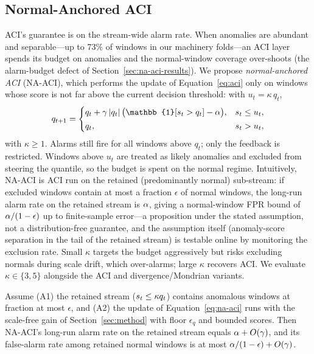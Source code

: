\subsection{Normal-Anchored ACI}
\label{sec:na-aci}
ACI's guarantee is on the stream-wide alarm rate. When anomalies are abundant and separable---up to 73\% of windows in our machinery folds---an ACI layer spends its budget on anomalies and the normal-window coverage over-shoots (the alarm-budget defect of Section~\ref{sec:na-aci-results}). We propose \emph{normal-anchored ACI} (NA-ACI), which performs the update of Equation~\ref{eq:aci} only on windows whose score is not far above the current decision threshold: with $u_t = \kappa\, q_t$,
\begin{equation}
q_{t+1} =
\begin{cases}
q_t + \gamma\,|q_t|\,\bigl(\mathbb{1}[\st>q_t]-\alphaNom\bigr), & \st \le u_t,\\[2pt]
q_t, & \st > u_t,
\end{cases}
\label{eq:na-aci}
\end{equation}
with $\kappa\ge 1$. Alarms still fire for all windows above $q_t$; only the feedback is restricted. Windows above $u_t$ are treated as likely anomalies and excluded from steering the quantile, so the budget is spent on the normal regime. Intuitively, NA-ACI is ACI run on the retained (predominantly normal) sub-stream: if excluded windows contain at most a fraction $\epsilon$ of normal windows, the long-run alarm rate on the retained stream is $\alpha$, giving a normal-window FPR bound of $\alpha/(1-\epsilon)$ up to finite-sample error---a proposition under the stated assumption, not a distribution-free guarantee, and the assumption itself (anomaly-score separation in the tail of the retained stream) is testable online by monitoring the exclusion rate. Small $\kappa$ targets the budget aggressively but risks excluding normals during scale drift, which over-alarms; large $\kappa$ recovers ACI. We evaluate $\kappa\in\{3,5\}$ alongside the ACI and divergence/Mondrian variants.

\begin{proposition}
\label{prop:na-aci}
Assume (A1) the retained stream ($s_t\le\kappa q_t$) contains anomalous windows at fraction at most $\epsilon$, and (A2) the update of Equation~\ref{eq:na-aci} runs with the scale-free gain of Section~\ref{sec:method} with floor $\epsilon_q$ and bounded scores. Then NA-ACI's long-run alarm rate on the retained stream equals $\alpha+O(\gamma)$, and its false-alarm rate among retained normal windows is at most $\alpha/(1-\epsilon)+O(\gamma)$.
\end{proposition}

